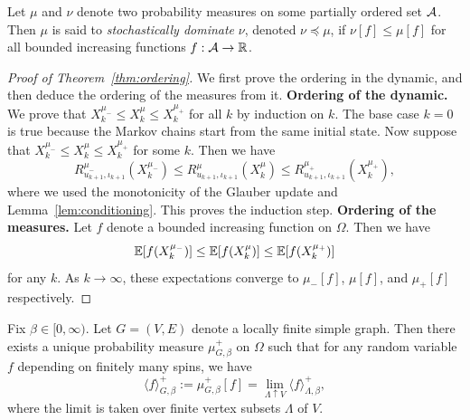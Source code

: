 \begin{definition}
    \label{def:stochastic_ordering}
    Let $\mu$ and $\nu$ denote two probability measures on some partially ordered set $\mathcal A$.
    Then $\mu$ is said to \emph{stochastically dominate} $\nu$, denoted $\nu\preceq\mu$,
    if $\nu[f]\leq\mu[f]$ for all bounded increasing functions $f:\mathcal A\to\mathbb R$.
\end{definition}

\begin{proof}[Proof of Theorem~\ref{thm:ordering}]
    We first prove the ordering in the dynamic, and then deduce the ordering of the
    measures from it.
    \textbf{Ordering of the dynamic.}
    We prove that $X_k^{\mu_-}\leq X_k^\mu\leq X_k^{\mu_+}$ for all $k$ by induction on $k$.
    The base case $k=0$ is true because the Markov chains start from the same initial state.
    Now suppose that $X_k^{\mu_-}\leq X_k^\mu\leq X_k^{\mu_+}$ for some $k$.
    Then we have
    \begin{equation}
        R_{u_{k+1},\iota_{k+1}}^{\mu_-}(X_k^{\mu_-})
        \leq
        R_{u_{k+1},\iota_{k+1}}^{\mu}(X_k^{\mu})
        \leq
        R_{u_{k+1},\iota_{k+1}}^{\mu_+}(X_k^{\mu_+}),
    \end{equation}
    where we used the monotonicity of the Glauber update and Lemma~\ref{lem:conditioning}.
    This proves the induction step.
    \textbf{Ordering of the measures.}
    Let $f$ denote a bounded increasing function on $\Omega$.
    Then we have
    \begin{equation}
        \label{eq:ordering_expectation}
        \E[f(X_k^{\mu_-})]\leq \E[f(X_k^\mu)]\leq \E[f(X_k^{\mu_+})]
    \end{equation}
    for any $k$.
    As $k\to\infty$, these expectations converge to $\mu_-[f]$, $\mu[f]$, and $\mu_+[f]$
    respectively.
\end{proof}

\begin{theorem}
    Fix $\beta\in[0,\infty)$.
    Let $G=(V,E)$ denote a locally finite simple graph.
    Then there exists a unique probability measure $\mu_{G,\beta}^+$ on $\Omega$
    such that for any random variable $f$ depending on finitely many spins, we have
    \begin{equation}
        \label{eq:infinite_volume_measure}
        \langle f\rangle_{G,\beta}^+ := \mu_{G,\beta}^+[f] = \lim_{\Lambda\uparrow V}
        \langle f\rangle_{\Lambda,\beta}^+,
    \end{equation}
    where the limit is taken over finite vertex subsets $\Lambda$ of $V$.
\end{theorem}
